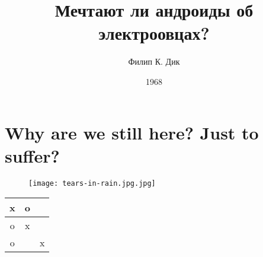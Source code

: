 \documentclass[a4paper,12pt]{article}
\title{Мечтают ли андроиды об электроовцах?}
\author{Филип К. Дик}
\date{1968}
\begin{document}
\maketitle %

\section*{Why are we still here? Just to suffer?} %

\begin{figure}[h] %
  \centering
  \texttt{[image: tears-in-rain.jpg.jpg]}
\end{figure}

\begin{table}[h] %
  \centering
  \begin{tabular}{|c|c|c|}
  \hline
  x & o &  \\ \hline
  o & x &  \\ \hline
  o &  & x \\ \hline
  \end{tabular}
\end{table}
\end{document}
